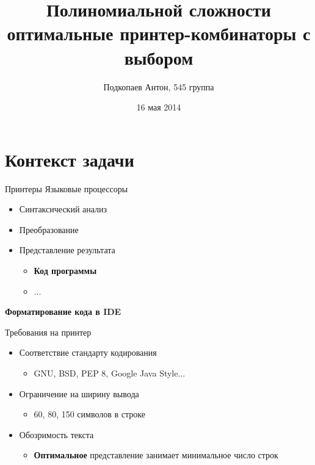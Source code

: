 \documentclass[sans]{beamer}
\begin{document}
\title
[PTOPPCC]
{Полиномиальной сложности оптимальные принтер-комбинаторы с выбором}
\author
[Подкопаев Антон]
{Подкопаев Антон, 545 группа}
\date [16-05-14]{16 мая 2014}

\begin{frame}[plain]
	\titlepage
\end{frame}

\section{Контекст задачи}

\begin{frame}{Принтеры}
	Языковые процессоры

	\begin{block}{}
		\begin{itemize}
			\item Синтаксический анализ
			\item Преобразование
			\item Представление результата
			\begin{itemize}
				\item \textbf{Код программы}
				\item ...
			\end{itemize}
		\end{itemize}
	\end{block}
  
  \textbf{Форматирование кода в IDE}

\end{frame}

\begin{frame}{Требования на принтер}
  \begin{itemize}
    \item Соответствие стандарту кодирования
      \begin{itemize}
        \item GNU, BSD, PEP 8, Google Java Style...
      \end{itemize}
      \vfill
    \item Ограничение на ширину вывода
      \begin{itemize}
        \item 60, 80, 150 символов в строке
      \end{itemize}
      \vfill
    \item Обозримость текста
      \begin{itemize}
        \item \textbf{Оптимальное} представление занимает
          минимальное число строк
      \end{itemize}
  \end{itemize}
\end{frame}
\end{document}
